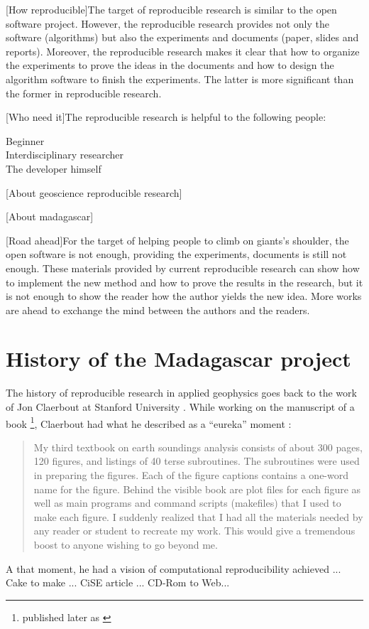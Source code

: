 [How reproducible]The target of reproducible research 
is similar to the open software project.
However, the reproducible research provides not only the software (algorithms)
but also the experiments and documents (paper, slides and reports).
Moreover, the reproducible research makes it clear that
how to organize the experiments to prove the ideas in the documents
and how to design the algorithm software to finish the experiments.
The latter is more significant than the former in reproducible research.

[Who need it]The reproducible research is helpful to the following people:
\begin{description}
\item [Beginner]
\item [Interdisciplinary researcher]
\item [The developer himself]
\end{description}

[About geoscience reproducible research]

[About madagascar]

[Road ahead]For the target of helping people to climb on giants's shoulder,
the open software is not enough, 
providing the experiments, documents is still not enough.
These materials provided by current reproducible research 
can show how to implement the new method
and how to prove the results in the research,
but it is not enough to show the reader
how the author yields the new idea.
More works are ahead to exchange the mind between the authors and the readers.


\section{History of the Madagascar project}

The history of reproducible research in applied geophysics goes back
to the work of Jon Claerbout at Stanford University
\cite[]{cise}. While working on the manuscript of a book
\footnote{published later as \cite[]{pvi}}, Claerbout had what he
described as a ``eureka'' moment \cite[]{Claerbout.sep.67.139}:
\begin{quote}
My third textbook on earth soundings analysis consists of about 300
pages, 120 figures, and listings of 40 terse subroutines. The
subroutines were used in preparing the figures. Each of the figure
captions contains a one-word name for the figure. Behind the visible
book are plot files for each figure as well as main programs and
command scripts (makefiles) that I used to make each figure. I
suddenly realized that I had all the materials needed by any reader or
student to recreate my work. This would give a tremendous boost to
anyone wishing to go beyond me.
\end{quote}
A that moment, he had a vision of computational reproducibility
achieved ... Cake to make ... CiSE article ... CD-Rom to Web...

